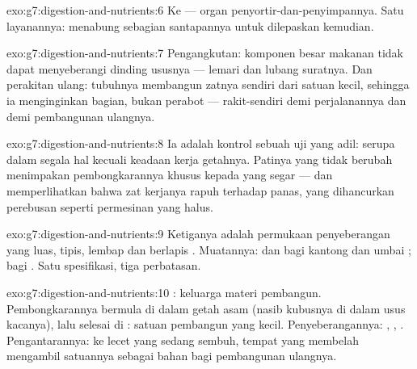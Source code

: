 \begin{solution}{exo:g7:digestion-and-nutrients:6}
Ke  --- organ penyortir-dan-penyimpannya. Satu layanannya:
menabung sebagian  santapannya untuk dilepaskan kemudian.
\end{solution}

\begin{solution}{exo:g7:digestion-and-nutrients:7}
Pengangkutan: komponen besar makanan tidak dapat menyeberangi dinding
ususnya --- lemari dan lubang suratnya. Dan perakitan ulang: tubuhnya
membangun zatnya sendiri dari satuan kecil, sehingga ia menginginkan
bagian, bukan perabot --- rakit-sendiri demi perjalanannya dan demi
pembangunan ulangnya.
\end{solution}

\begin{solution}{exo:g7:digestion-and-nutrients:8}
Ia adalah kontrol sebuah uji yang adil: serupa dalam segala hal
kecuali keadaan kerja getahnya. Patinya yang tidak berubah menimpakan
pembongkarannya khusus kepada  yang segar --- dan
memperlihatkan bahwa zat kerjanya rapuh terhadap panas, yang
dihancurkan perebusan seperti permesinan yang halus.
\end{solution}

\begin{solution}{exo:g7:digestion-and-nutrients:9}
Ketiganya adalah permukaan penyeberangan yang luas, tipis, lembap dan
berlapis . Muatannya:  dan  bagi kantong
 dan umbai ;  bagi . Satu
spesifikasi, tiga perbatasan.
\end{solution}

\begin{solution}{exo:g7:digestion-and-nutrients:10}
: keluarga materi pembangun. Pembongkarannya bermula di dalam
getah asam  (nasib kubusnya di dalam usus kacanya), lalu
selesai di : satuan pembangun yang kecil.
Penyeberangannya: , , . Pengantarannya: ke lecet
yang sedang sembuh, tempat   yang membelah mengambil satuannya
sebagai bahan bagi pembangunan ulangnya.
\end{solution}

